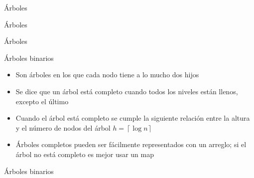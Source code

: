 \documentclass[]{beamer}
\begin{document}
\begin{frame}{\'Arboles}
\end{frame}

\begin{frame}{\'Arboles}
  
\end{frame}

\begin{frame}{\'Arboles}
  
\end{frame}

\begin{frame}{\'Arboles binarios}
  \begin{itemize}
    \item Son \'arboles en los que cada nodo tiene a lo mucho dos hijos
      \pause
    \item Se dice que un \'arbol est\'a completo cuando todos los niveles est\'an llenos, excepto el \'ultimo
      \pause
    \item Cuando el \'arbol est\'a completo se cumple la siguiente relaci\'on entre la altura y el n\'umero de nodos del \'arbol $h = \left\lceil \log n \right\rceil $
      \pause
    \item \'Arboles completos pueden ser f\'acilmente representados con un arreglo; si el \'arbol no est\'a completo es mejor usar un map
  \end{itemize}
\end{frame}

\begin{frame}{\'Arboles binarios}
\end{frame}
\end{document}
